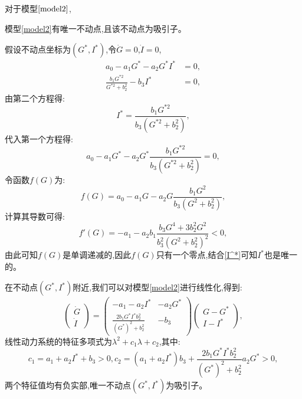 对于模型$\ref{model2}$,
\begin{prop}
    模型\ref{model2}有唯一不动点,且该不动点为吸引子。
\end{prop}
\begin{pf}
    假设不动点坐标为$(G^*,I^*)$,令$\dot{G} = 0$,$\dot{I} = 0$,
    \begin{equation}
        \begin{aligned}
            a_0-a_1G^*-a_2G^*I^* & = 0,  \\
            \frac{b_1 G^{*2}}{G^{*2} + b_2^2} - b_3 I^* & = 0,
        \end{aligned}
    \end{equation}
    由第二个方程得:
    \begin{equation}\label{I^*}
        I^*= \frac{b_1 G^{*2}}{b_3(G^{*2} + b_2^2)},
    \end{equation}
    代入第一个方程得:
    \begin{equation}
        a_0-a_1G^*-a_2G^*\frac{b_1 G^{*2}}{b_3(G^{*2} + b_2^2)} = 0,
    \end{equation}
    令函数$f(G)$为:
    \begin{equation}
        f(G) = a_0-a_1G-a_2G\frac{b_1 G^2}{b_3(G^2 + b_2^2)},
    \end{equation}
    计算其导数可得:
    \begin{equation}
        f'(G) = -a_1 - a_2b_1\frac{b_3G^4+3b_2^2G^2}{b_3^2(G^2+b_2^2)^2}<0,
    \end{equation}
    由此可知$f(G)$是单调递减的,因此$f(G)$只有一个零点,结合\ref{I^*}可知$I^*$也是唯一的。

    在不动点$(G^*,I^*)$附近,我们可以对模型\ref{model2}进行线性化,得到:
    \begin{equation}
        \begin{pmatrix}
            \dot{G}  \\
            \dot{I}
        \end{pmatrix}=
        \begin{pmatrix}
            -a_1-a_2I^* & -a_2G^*  \\
            \frac{2b_1G^*I^*b_2^2}{(G^*)^2+b_2^2} & -b_3
        \end{pmatrix}
        \begin{pmatrix}
            G-G^*  \\
            I-I^*
        \end{pmatrix},
    \end{equation}
    线性动力系统的特征多项式为$\lambda^2+c_1\lambda+c_2$,其中:
    \begin{equation}
        c_1=a_1+a_2I^*+b_3>0, c_2=(a_1+a_2I^*)b_3+\frac{2b_1G^*I^*b_2^2}{(G^*)^2+b_2^2}a_2G^*>0,
    \end{equation}
    两个特征值均有负实部,唯一不动点$(G^*,I^*)$为吸引子。
\end{pf}
